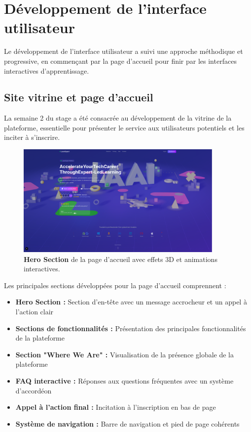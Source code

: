 \section{Développement de l'interface utilisateur}

Le développement de l'interface utilisateur a suivi une approche méthodique et progressive, en commençant par la page d'accueil pour finir par les interfaces interactives d'apprentissage.

\subsection{Site vitrine et page d'accueil}

La semaine 2 du stage a été consacrée au développement de la vitrine de la plateforme, essentielle pour présenter le service aux utilisateurs potentiels et les inciter à s'inscrire.

\begin{figure}[h!]
  \centering
  \includegraphics[width=0.9\textwidth,keepaspectratio]{week_2_img/last_and_improved_hero_section_withe_3d_effects_etc.png}
  \caption{\textbf{Hero Section} de la page d'accueil avec effets 3D et animations interactives.}
  \label{fig:hero_section}
\end{figure}

Les principales sections développées pour la page d'accueil comprennent :
\begin{itemize}
  \item \textbf{Hero Section :} Section d'en-tête avec un message accrocheur et un appel à l'action clair
  \item \textbf{Sections de fonctionnalités :} Présentation des principales fonctionnalités de la plateforme
  \item \textbf{Section "Where We Are" :} Visualisation de la présence globale de la plateforme
  \item \textbf{FAQ interactive :} Réponses aux questions fréquentes avec un système d'accordéon
  \item \textbf{Appel à l'action final :} Incitation à l'inscription en bas de page
  \item \textbf{Système de navigation :} Barre de navigation et pied de page cohérents
\end{itemize}


